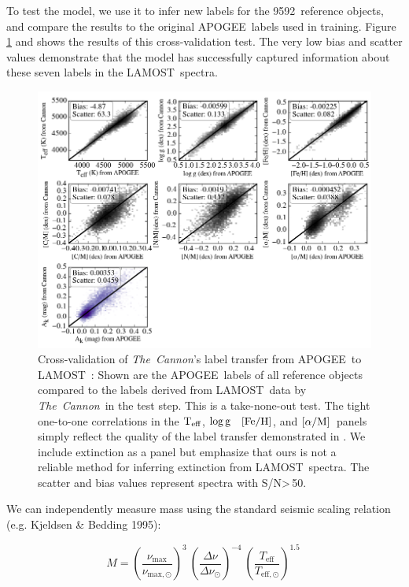 \documentclass[12pt, preprint]{aastex}
\newcommand{\tc}{\textsl{The~Cannon}}
\newcommand{\apogee}{APOGEE}
\newcommand{\lamost}{LAMOST}
\newcommand{\teff}{\mbox{$\rm T_{eff}$}}
\newcommand{\logg}{\mbox{$\rm \log g$}}
\newcommand{\feh}{\mbox{$\rm [Fe/H]$}}
\newcommand{\alpham}{\mbox{$\rm [\alpha/M]$}}
\newcommand{\ntrobj}{9592}
\newcommand{\snr}{S/N}
\begin{document}
To test the model, we use it to infer new labels for the
\ntrobj\ reference objects, and compare the results 
to the original \apogee\ labels used in training.
Figure \ref{fig:cross-validation} and 
shows the results of
this cross-validation test. The very low bias
and scatter values demonstrate 
that the model has successfully
captured information about these seven labels in the
\lamost\ spectra.

\begin{figure}[!hp]
\centering
\includegraphics[scale=0.75]{xval.png}
\caption{Cross-validation of \tc 's label transfer from \apogee\ to \lamost~: Shown are the \apogee\ labels of all reference objects compared to the labels derived from \lamost\ data by \tc\ in the test step. This is a take-none-out test. The tight one-to-one correlations in the \teff , \logg~ \feh, and \alpham\ panels simply reflect the quality of the label transfer demonstrated in \citet{Ho2016}.
We include extinction as a panel
but emphasize that ours is not a reliable method for 
inferring extinction from \lamost\ spectra.
The scatter and bias values represent spectra with \snr\textgreater\,50.
}
\label{fig:cross-validation}
\end{figure}

We can independently measure mass using the standard seismic scaling relation (e.g. Kjeldsen \& Bedding 1995):

\begin{equation} \label{eq:mass}
M= \left( \frac{\nu_{\mathrm{max}}}{\nu_{\mathrm{max,\odot}}}\right)^3\  \left( \frac{\Delta \nu}{\Delta \nu_{\odot}}\right)^{-4} \ \left( \frac{T_{\mathrm{eff}}}{T_{\mathrm{eff,\odot}}}\right)^{1.5} \ 
\end{equation}
\end{document}
